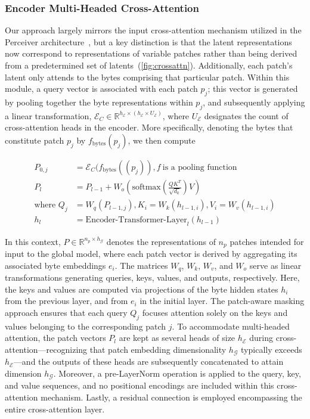 \subsubsection{Encoder Multi-Headed Cross-Attention}
\label{sec:enc-cross-attn}
Our approach largely mirrors the input cross-attention mechanism utilized in the Perceiver architecture~\citep{jaegle2021perceiver}, but a key distinction is that the latent representations now correspond to representations of variable patches rather than being derived from a predetermined set of latents~(\autoref{fig:crossattn}). Additionally, each patch's latent only attends to the bytes comprising that particular patch. Within this module, a query vector is associated with each patch $p_j$; this vector is generated by pooling together the byte representations within $p_j$, and subsequently applying a linear transformation, $\mathcal{E}_{C} \in \mathbb{R}^{h_{\mathcal{E}} \times (h_{\mathcal{E}} \times U_{\mathcal{E}})}$, where $U_{\mathcal{E}}$ designates the count of cross-attention heads in the encoder. More specifically, denoting the bytes that constitute patch $p_j$ by $f_{\text{bytes}}(p_j)$, we then compute

\begin{align}
P_{0,j} &= \mathcal{E}_{C}(f_\text{bytes}((p_j)), f~ \text{is a pooling function} \\
P_l &= P_{l-1} + W_o\left(\text{softmax}\left(\frac{QK^T}{\sqrt{d_k}}\right)V\right) \\
\text{where } Q_j &= W_q(P_{l-1,j}), K_i = W_k(h_{l-1,i}), V_i = W_v(h_{l-1,i}) \\
h_l &= \text{Encoder-Transformer-Layer}_l(h_{l-1})
\end{align}

In this context, $P \in \mathbb{R}^{n_p \times h_{\mathcal{G}}}$ denotes the representations of $n_p$ patches intended for input to the global model, where each patch vector is derived by aggregating its associated byte embeddings $e_i$. The matrices $W_q$, $W_k$, $W_v$, and $W_o$ serve as linear transformations generating queries, keys, values, and outputs, respectively. Here, the keys and values are computed via projections of the byte hidden states $h_i$ from the previous layer, and from $e_i$ in the initial layer. The patch-aware masking approach ensures that each query $Q_j$ focuses attention solely on the keys and values belonging to the corresponding patch $j$. To accommodate multi-headed attention, the patch vectors $P_l$ are kept as several heads of size $h_{\mathcal{E}}$ during cross-attention—recognizing that patch embedding dimensionality $h_{\mathcal{G}}$ typically exceeds $h_{\mathcal{E}}$—and the outputs of these heads are subsequently concatenated to attain dimension $h_{\mathcal{G}}$. Moreover, a pre-LayerNorm operation is applied to the query, key, and value sequences, and no positional encodings are included within this cross-attention mechanism. Lastly, a residual connection is employed encompassing the entire cross-attention layer.

